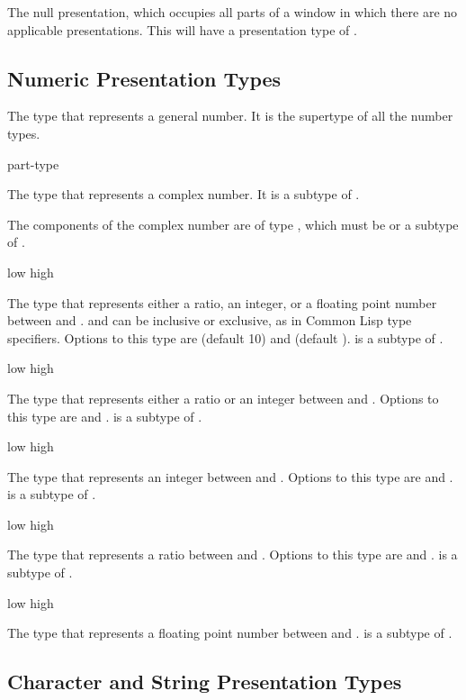The null presentation, which occupies all parts of a window in which there are
no applicable presentations.  This will have a presentation type of .


\subsection {Numeric Presentation Types}

 {}

The type that represents a general number.  It is the supertype of all the
number types.

 {\optional part-type}

The type that represents a complex number.  It is a subtype of .

The components of the complex number are of type , which must
be  or a subtype of .

 {\optional low high}

The type that represents either a ratio, an integer, or a floating point number
between  and .   and  can be inclusive or
exclusive, as in Common Lisp type specifiers.  Options to this type are
 (default 10) and  (default ).   is a
subtype of .

 {\optional low high}

The type that represents either a ratio or an integer between  and
.  Options to this type are  and .  
is a subtype of .

 {\optional low high}

The type that represents an integer between  and .  Options
to this type are  and .   is a subtype of
.

 {\optional low high}

The type that represents a ratio between  and .  Options to
this type are  and .   is a subtype of
.

 {\optional low high}

The type that represents a floating point number between  and
.   is a subtype of .


\subsection {Character and String Presentation Types}

